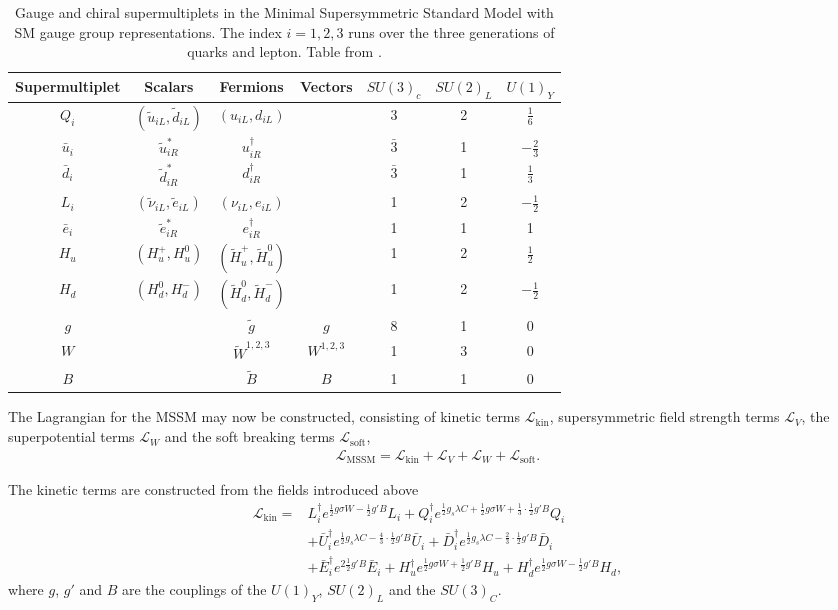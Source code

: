 \documentclass[twoside,english]{uiofysmaster}
\begin{document}
\begin{table}
\centering
\begin{tabular}{ccccccc}
\hline
Supermultiplet & Scalars & Fermions & Vectors & $SU(3)_c$ & $SU(2)_L$ & $U(1)_Y$\\
\hline
$Q_i$ & $(\tilde{u}_{iL}, \tilde{d}_{iL})$ & $(u_{iL}, d_{iL})$ & & 3 & 2 & $\frac{1}{6}$\\
$\bar{u}_i$ & $\tilde{u}_{iR}^*$ & $u_{iR}^{\dagger}$ && $\bar{3}$ & 1 & $- \frac{2}{3}$\\
$\bar{d}_i$ & $\tilde{d}_{iR}^*$ & $d_{iR}^{\dagger}$ && $\bar{3}$ & 1 & $\frac{1}{3}$\\
\hline
$L_i$ & $(\tilde{\nu}_{iL}, \tilde{e}_{iL})$ & $(\nu_{iL}, e_{iL})$& & 1 & 2 & $- \frac{1}{2}$\\
$\bar{e}_i$ & $\tilde{e}_{iR}^*$ & $e_{iR}^{\dagger}$ && 1 & 1& 1\\
\hline
$H_u$ & $(H_u^+, H_u^0)$ & $(\tilde{H}_u^+, \tilde{H}_u^0)$ & & 1 & 2 & $\frac{1}{2}$\\
$H_d$ & $(H_d^0, H_d^-)$ & $(\tilde{H}_d^0, \tilde{H}_d^-)$ && 1 & 2 & $ - \frac{1}{2}$\\
\hline
$g$ & & $\tilde{g}$ & $g$ & 8 & 1 & 0\\
$W$ && $\tilde{W}^{1,2,3}$ & $W^{1,2,3}$ & 1 & 3 & 0 \\
$B$ && $\tilde{B}$ & $B$ & 1 & 1 & 0
\end{tabular}
\caption{Gauge and chiral supermultiplets in the Minimal Supersymmetric Standard Model with SM gauge group representations. The index $i=1,2,3$ runs over the three generations of quarks and lepton. Table from \cite{kvellestad2015chasing}.}
\label{Tab:: Phys. back. : MSSM multiplets}
\end{table}

The Lagrangian for the MSSM may now be constructed, consisting of kinetic terms $\mathcal{L}_{\text{kin}}$, supersymmetric field strength terms $\mathcal{L}_V$, the superpotential terms $\mathcal{L}_W$ and the soft breaking terms $\mathcal{L}_{\text{soft}}$,
\begin{align}
\mathcal{L}_{\text{MSSM}} = \mathcal{L}_{\text{kin}} + \mathcal{L}_V + \mathcal{L}_W + \mathcal{L}_{\text{soft}}.
\end{align}

The kinetic terms are constructed from the fields introduced above
\begin{align}
\mathcal{L}_{\text{kin}} =& L_i^{\dagger} e^{\frac{1}{2}g \sigma W - \frac{1}{2}g'B} L_i + Q_i^{\dagger} e^{\frac{1}{2}g_s \lambda C+ \frac{1}{2} g \sigma W + \frac{1}{3} \cdot \frac{1}{2} g' B} Q_i \nonumber \\
&+ \bar{U}_i^{\dagger} e^{\frac{1}{2}g_s \lambda C - \frac{4}{3} \cdot \frac{1}{2} g' B} \bar{U}_i + \bar{D}_i^{\dagger} e^{\frac{1}{2}g_s \lambda C - \frac{2}{3} \cdot \frac{1}{2} g' B} \bar{D}_i \nonumber \\
&+ \bar{E}_i^{\dagger} e^{2 \frac{1}{2}g'B} \bar{E}_i + H_u^{\dagger} e^{\frac{1}{2} g \sigma W + \frac{1}{2} g'B} H_u + H_d^{\dagger} e^{\frac{1}{2} g \sigma W - \frac{1}{2} g'B} H_d,
\end{align}
where $g$, $g'$ and $B$ are the couplings of the $U(1)_Y$, $SU(2)_L$ and the $SU(3)_C$. 
\end{document}
